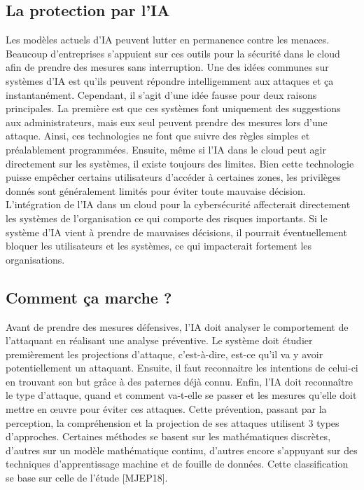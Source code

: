 \documentclass[a4paper, 12pt]{article}
\begin{document}
    \subsection{La protection par l'IA}
      Les modèles actuels d'IA peuvent lutter en permanence contre les
      menaces. Beaucoup d’entreprises s'appuient sur ces outils pour la sécurité
      dans le cloud afin de prendre des mesures sans interruption. Une des idées
      communes sur systèmes d'IA est qu'ils peuvent répondre intelligemment aux
      attaques et ça instantanément. Cependant, il s'agit d'une idée fausse pour
      deux raisons principales. La première est que ces systèmes font uniquement
      des suggestions aux administrateurs, mais eux seul peuvent prendre des
      mesures lors d'une attaque. Ainsi, ces technologies ne font que suivre des
      règles simples et préalablement programmées. Ensuite, même si l’IA dans le
      cloud peut agir directement sur les systèmes, il existe toujours des
      limites. Bien cette technologie puisse empêcher certains utilisateurs
      d'accéder à certaines zones, les privilèges donnés sont généralement
      limités pour éviter toute mauvaise décision. \\

      L’intégration de l’IA dans un cloud pour la cybersécurité affecterait
      directement les systèmes de l’organisation ce qui comporte des risques
      importants. Si le système d'IA vient à prendre de mauvaises décisions, il
      pourrait éventuellement bloquer les utilisateurs et les systèmes, ce qui
      impacterait fortement les organisations.

    \subsection{Comment ça marche ?}
      Avant de prendre des mesures défensives, l’IA doit analyser le
      comportement de l’attaquant en réalisant une analyse préventive. Le
      système doit étudier premièrement les projections d’attaque, c’est-à-dire,
      est-ce qu’il va y avoir potentiellement un attaquant. Ensuite, il faut
      reconnaitre les intentions de celui-ci en trouvant son but grâce à des
      paternes déjà connu. Enfin, l’IA doit reconnaître le type d’attaque, quand
      et comment va-t-elle se passer et les mesures qu’elle doit mettre en œuvre
      pour éviter ces attaques. Cette prévention, passant par la perception, la
      compréhension et la projection de ses attaques utilisent 3 types
      d’approches. Certaines méthodes se basent sur les mathématiques discrètes,
      d'autres sur un modèle mathématique continu, d'autres encore s'appuyant
      sur des techniques d'apprentissage machine et de fouille de données. Cette
      classification se base sur celle de l'étude [MJEP18]. \\
\end{document}
